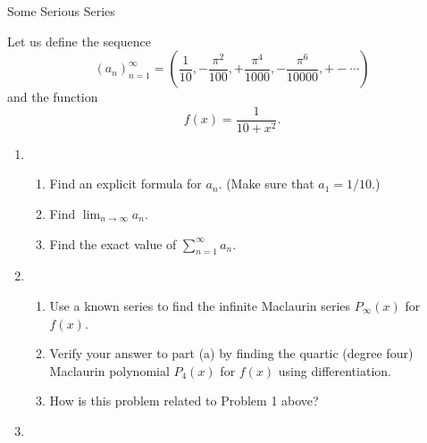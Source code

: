 \documentclass[12pt]{article}
\begin{document}
\begin{center}

{\Large Some Serious Series} 

\end{center}

\vspace*{.2in}

Let us define the sequence $${\displaystyle (a_n)_{n=1}^{\infty} = \left(\frac{1}{10},-\frac{\pi^2}{100},+\frac{\pi^4}{1000},-\frac{\pi^6}{10000},+- \cdots \right)}$$ and the function $${\displaystyle f(x)=\frac{1}{10+x^2}}.$$

\begin{enumerate}
  
\item  

\begin{enumerate}

\item Find an explicit formula for $a_n$.  (Make sure that $a_1=1/10$.)




\item Find $\lim_{n \rightarrow \infty} a_n$.



\item Find the exact value of $\sum_{n=1}^{\infty} a_n$.



\end{enumerate}


\item  

\begin{enumerate}

\item Use a known series to find the infinite Maclaurin series $P_{\infty}(x)$ for $f(x)$.



\item Verify your answer to part (a) by finding the quartic (degree four) Maclaurin polynomial $P_{4}(x)$ for $f(x)$ using differentiation.

\item How is this problem related to Problem 1 above?


\end{enumerate}

\item  


\begin{enumerate}


\end{enumerate}
\end{enumerate}
\end{document}
